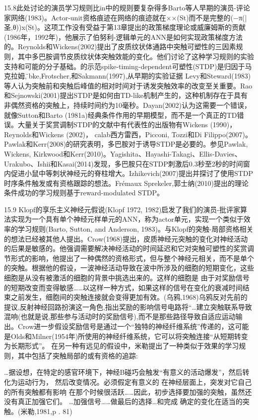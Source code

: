 15.8此处讨论的演员学习规则比in中的规则要复杂得多Barto等人早期的演员-评论家网络(1983)。Actor-unit资格痕迹在网络的痕迹就在××(St)而不是完整的(−π(|圣,θ))x(St)。这项工作没有受益于第13章提出的政策梯度理论或威廉姆斯的贡献(1986年，1992年)，他展示了伯努利-逻辑单元的ANN是如何实现政策梯度方法的。Reynolds和Wickens(2002)提出了皮质纹状体通路中突触可塑性的三因素规则，其中多巴胺调节皮质纹状体突触效能的变化。他们讨论了这种学习规则的实验支持和可能的分子基础。的示范spike-timing-dependent可塑性(STDP)是归因于马克拉姆,陆̈bke,Frotscher,和Sakmann(1997),从早期的实验证据
Levy和Steward(1983)等人认为突触前和突触后峰值的相对时间对于诱发突触效率的改变至关重要。Rao和Sejnowski(2001)提出STDP是如何由TD-like机制产生的，这种机制存在于具有非偶然资格的突触上，持续时间约为10毫秒。Dayan(2002)认为这需要一个错误，就像Sutton和Barto (1981a)经典条件作用的早期模型，而不是一个真正的TD错误。大量关于奖赏调制STDP的文献中有代表性的出版物有Wickens (1990)， Reynolds和Wickens (2002)， calab西方雷西，Picconi, Tozzi和Di Filippo(2007)。Pawlak和Kerr(2008)的研究表明，多巴胺对于诱导STDP是必要的。参见Pawlak, Wickens, Kirkwood和Kerr(2010)。Yagishita、Hayashi-Takagi、Ellis-Davies、Urakubo、Ishii和Kasai(2014)发现，多巴胺只在STDP刺激后0.3秒至2秒的时间窗内促进小鼠中等刺状神经元的脊柱增大。Izhikevich(2007)提出并探讨了使用STDP时序条件触发或有资格跟踪的想法。Frémaux Sprekeler,郭士纳(2010)提出的理论条件成功的学习规则基于reward-modulated STDP。

15.9 Klopf的享乐主义神经元假说(Klopf 1972, 1982)启发了我们的演员-批评家算法实现为一个具有单个神经元样单元的ANN，称为actor单元，实现一个类似于效率的学习规则(Barto, Sutton, and Anderson, 1983)。与Klopf的突触-局部资格相关的想法已经被其他人提出。Crow(1968)提出，皮质神经元突触的变化对神经活动的后果是敏感的。他强调需要解决神经活动的时间延迟和它对突触可塑性的奖赏调节形式的影响，他提出了一种偶然的资格形式，但与整个神经元相关，而不是单个的突触。根据他的假设，一波神经活动导致在波中所涉及的细胞的短期变化，这些细胞是从没有被激活的细胞的背景中挑选出来的。这样的细胞是
由于对奖励信号的短期改变而变得敏感……以这样一种方式，如果这样的信号在变化的衰减时间结束之前发生，细胞间的突触连接就会变得更加有效。(乌鸦,1968)乌鸦反对先前的提议,反射神经回路扮演这一角色,指出奖励的影响信号电路将“…建立突触联系导致混响(也就是说,那些参与活动时的奖励信号),而不是那些路径导致自适应运动输出。Crow进一步假设奖励信号是通过一个“独特的神经纤维系统”传递的，这可能是Olds和Milner(1954年)所使用的神经纤维系统，它可以将突触连接“从短期转变为长期形式”。
在另一种有远见的假设中，米勒提出了一种类似于效果的学习规则，其中包括了突触局部的或有资格的追踪:

…据设想，在特定的感官环境下，神经B碰巧会触发“有意义的活动爆发”，然后转化为运动行为，
然后改变情况。必须假定有意义的
在神经层面上，突发对它自己的所有突触都有影响
在那个时候很活跃……因此，初步选择要加强的突触，虽然还没有真正加强它们。
…加强信号……做最后的选择…和完成
确定的变化在适当的突触。(米勒,1981,p . 81)

